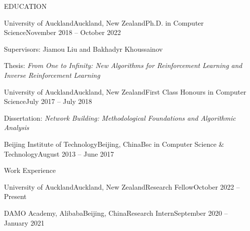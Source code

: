 \documentclass{resume} %
\begin{document}

\begin{rSection}{EDUCATION}

\begin{rSubsection}{University of Auckland}{Auckland, New Zealand}{Ph.D. in Computer Science}{November 2018 -- October 2022}%
\item Supervisors: Jiamou Liu and Bakhadyr Khoussainov
\item Thesis: {\em From One to Infinity: New Algorithms for Reinforcement Learning and Inverse Reinforcement Learning}
\end{rSubsection}

\begin{rSubsection}{University of Auckland}{Auckland, New Zealand}{First Class Honours in Computer Science}{July 2017 -- July 2018}
\item Dissertation: {\em Network Building: Methodological Foundations and Algorithmic Analysis}
\end{rSubsection}

\begin{rSubsection}{Beijing Institute of Technology}{Beijing, China}{Bsc in Computer Science \& Technology}{August 2013 -- June 2017}
\end{rSubsection}
\end{rSection}


\begin{rSection}{Work Experience}
\begin{rSubsection}{University of Auckland}{Auckland, New Zealand}{Research Fellow}{October 2022 -- Present}
\end{rSubsection}
	\begin{rSubsection}{DAMO Academy, Alibaba}{Beijing, China}{Research Intern}{September 2020 -- January 2021}
\end{rSubsection}
\end{rSection}
\end{document}
